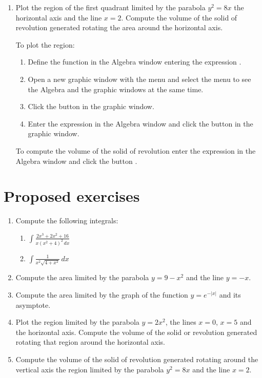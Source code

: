 \begin{enumerate}[leftmargin=*]
\item Plot the region of the first quadrant limited by the parabola $y^2=8x$ the horizontal axis and the line $x=2$. 
Compute the volume of the solid of revolution generated rotating the area around the horizontal axis. 
\begin{indication}
To plot the region:
\begin{enumerate}
\item Define the function in the Algebra window entering the expression .
\item Open a new graphic window with the menu  and select the menu  to see the Algebra and the graphic windows at the same time.
\item Click the button  in the graphic window.
\item Enter the expression  in the Algebra window and click the button  in the graphic window.
\end{enumerate}
To compute the volume of the solid of revolution enter the expression  in the Algebra window and click the button .
\end{indication}

\end{enumerate}


\section{Proposed exercises}
\begin{enumerate}[leftmargin=*]
\item Compute the following integrals:
\begin{enumerate}
\item $\displaystyle \int \frac{2x^3+2x^2+16}{x(x^2+4)^2\,dx}$
\item $\displaystyle \int \frac{1}{x^2\sqrt{4+x^2}}\,dx$
\end{enumerate}

\item Compute the area limited by the parabola $y=9-x^2$ and the line $y=-x$.

\item Compute the area limited by the graph of the function $y=e^{-|x|}$ and its asymptote.

\item Plot the region limited by the parabola $y=2x^2$, the lines $x=0$, $x=5$ and the horizontal axis. 
Compute the volume of the solid or revolution generated rotating that region around the horizontal axis.

\item Compute the volume of the solid of revolution generated rotating around the vertical axis the region limited by the parabola $y^2=8x$ and the line $x=2$.
\end{enumerate}
